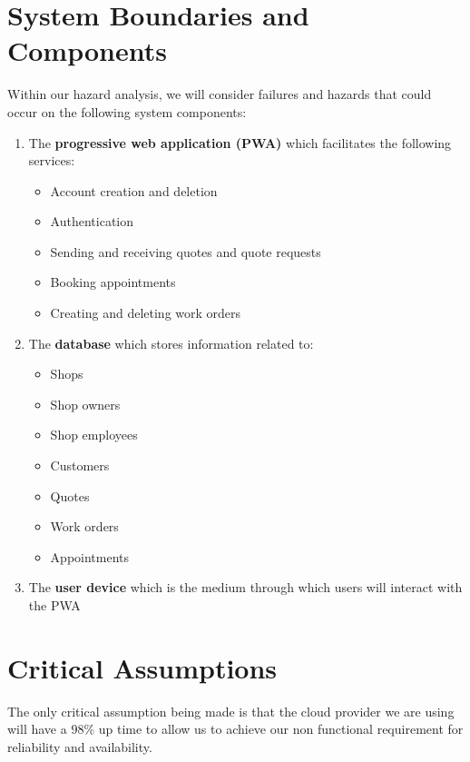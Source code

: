 \documentclass{article}
\begin{document}
\section{System Boundaries and Components}
Within our hazard analysis, we will consider failures and hazards that could occur on the following system components:
\begin{enumerate}
    \item The \textbf{progressive web application (PWA)} which facilitates the following services:
    \begin{itemize}
        \item Account creation and deletion
        \item Authentication
        \item Sending and receiving quotes and quote requests
        \item Booking appointments
        \item Creating and deleting work orders
    \end{itemize}
    \item The \textbf{database} which stores information related to:
    \begin{itemize}
        \item Shops
        \item Shop owners
        \item Shop employees
        \item Customers
        \item Quotes
        \item Work orders
        \item Appointments
    \end{itemize}
    \item The \textbf{user device} which is the medium through which users will interact with the PWA
\end{enumerate}

\section{Critical Assumptions}

The only critical assumption being made is that the cloud provider we are using will have a 98\% up time to allow us to achieve our non functional requirement for reliability and availability.

\end{document}
